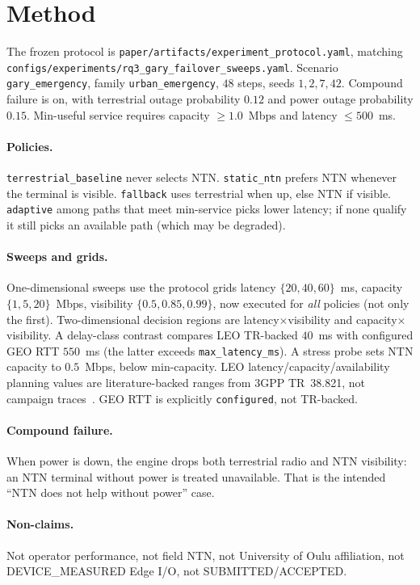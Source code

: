\section{Method}
\label{sec:method}
The frozen protocol is \texttt{paper/artifacts/experiment\_protocol.yaml}, matching \texttt{configs/experiments/rq3\_gary\_failover\_sweeps.yaml}.
Scenario \texttt{gary\_emergency}, family \texttt{urban\_emergency}, $48$ steps, seeds $1,2,7,42$.
Compound failure is on, with terrestrial outage probability $0.12$ and power outage probability $0.15$.
Min-useful service requires capacity $\ge 1.0$~Mbps and latency $\le 500$~ms.

\paragraph{Policies.}
\texttt{terrestrial\_baseline} never selects NTN.
\texttt{static\_ntn} prefers NTN whenever the terminal is visible.
\texttt{fallback} uses terrestrial when up, else NTN if visible.
\texttt{adaptive} among paths that meet min-service picks lower latency; if none qualify it still picks an available path (which may be degraded).

\paragraph{Sweeps and grids.}
One-dimensional sweeps use the protocol grids
latency $\{20,40,60\}$~ms, capacity $\{1,5,20\}$~Mbps, visibility $\{0.5,0.85,0.99\}$, now executed for \emph{all} policies (not only the first).
Two-dimensional decision regions are latency$\times$visibility and capacity$\times$visibility.
A delay-class contrast compares LEO TR-backed $40$~ms with configured GEO RTT $550$~ms (the latter exceeds \texttt{max\_latency\_ms}).
A stress probe sets NTN capacity to $0.5$~Mbps, below min-capacity.
LEO latency/capacity/availability planning values are literature-backed ranges from 3GPP TR~38.821, not campaign traces~\cite{3gpp_tr38821}.
GEO RTT is explicitly \texttt{configured}, not TR-backed.

\paragraph{Compound failure.}
When power is down, the engine drops both terrestrial radio and NTN visibility: an NTN terminal without power is treated unavailable.
That is the intended ``NTN does not help without power'' case.

\paragraph{Non-claims.}
Not operator performance, not field NTN, not University of Oulu affiliation, not DEVICE\_MEASURED Edge I/O, not SUBMITTED/ACCEPTED.
